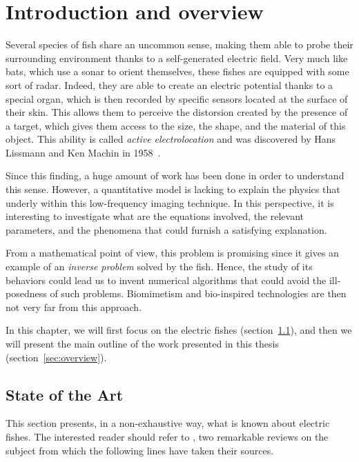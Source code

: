 \chapter{Introduction and overview}

Several species of fish share an uncommon sense, making them able
to probe their surrounding environment thanks to a self-generated
electric field. Very much like bats, which use a sonar to orient themselves,
these fishes are equipped with some sort of radar. Indeed, they are
able to create an electric potential thanks to a special organ, which
is then recorded by specific sensors located at the surface of their
skin. This allows them to perceive the distorsion created
by the presence of a target, which gives them access to the size,
the shape, and the material of this object. This ability is called
\emph{active electrolocation} and was discovered by Hans Lissmann
and Ken Machin in 1958~\cite{lissmann1958mechanism}.

Since this finding, a huge amount of work has been done in order to
understand this sense. However, a quantitative model is lacking to
explain the physics that underly within this low-frequency imaging
technique. In this perspective, it is interesting to investigate what
are the equations involved, the relevant parameters, and the phenomena
that could furnish a satisfying explanation.

From a mathematical point of view, this problem is promising since
it gives an example of an \emph{inverse problem} solved by the fish.
Hence, the study of its behaviors could lead us to invent numerical
algorithms that could avoid the ill-posedness of such problems. Biomimetism
and bio-inspired technologies are then not very far from this approach.

\medskip{}


In this chapter, we will first focus on the electric fishes (section~\ref{sec:state-of-the-art}),
and then we will present the main outline of the work presented in
this thesis (section~\ref{sec:overview}).


\section{State of the Art}

\label{sec:state-of-the-art}

This section presents, in a non-exhaustive way, what is known about
electric fishes. The interested reader should refer to \cite{neuro,moller1995electric},
two remarkable reviews on the subject from which the following lines
have taken their sources.


